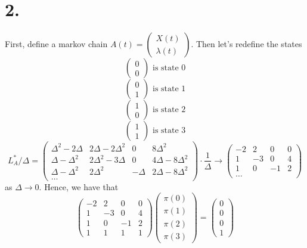 \documentclass[11pt]{article}
\begin{document}
\section*{2.}
First, define a markov chain $A(t) = \begin{pmatrix} X(t) \\ \lambda(t) \end{pmatrix}$. Then let's redefine the states 
\[
    \begin{pmatrix} 0 \\ 0 \end{pmatrix} \text{ is state 0}
\]
\[
    \begin{pmatrix} 0 \\ 1 \end{pmatrix} \text{ is state 1}
\]
\[
    \begin{pmatrix} 1 \\ 0 \end{pmatrix} \text{ is state 2}
\]
\[
    \begin{pmatrix} 1 \\ 1 \end{pmatrix} \text{ is state 3}
\]
\[
    L^*_A/\Delta = 
    \begin{pmatrix}
        \Delta^2 - 2\Delta & 2\Delta - 2\Delta^2 & 0 & 8\Delta^2 \\
        \Delta - \Delta^2 & 2\Delta^2 - 3\Delta & 0 & 4\Delta - 8\Delta^2 \\
        \Delta - \Delta^2 & 2\Delta^2 & - \Delta & 2\Delta - 8\Delta^2 \\
        \hdots
    \end{pmatrix}
    \cdot \frac{1}{\Delta}
    \to
    \begin{pmatrix}
        -2 & 2 & 0 & 0 \\
        1 & -3 & 0 & 4 \\
        1 & 0 & -1 & 2 \\
        \hdots
    \end{pmatrix}
\]
as $\Delta \to 0$.
Hence, we have that 
\[
    \begin{pmatrix}
        -2 & 2 & 0 & 0 \\
        1 & -3 & 0 & 4 \\
        1 & 0 & -1 & 2 \\
        1 & 1 & 1 & 1
    \end{pmatrix}
    \begin{pmatrix}
        \pi(0) \\
        \pi(1) \\
        \pi(2) \\
        \pi(3)
    \end{pmatrix}
    = 
    \begin{pmatrix}
        0 \\
        0 \\
        0 \\
        1
    \end{pmatrix}
\]
\end{document}
